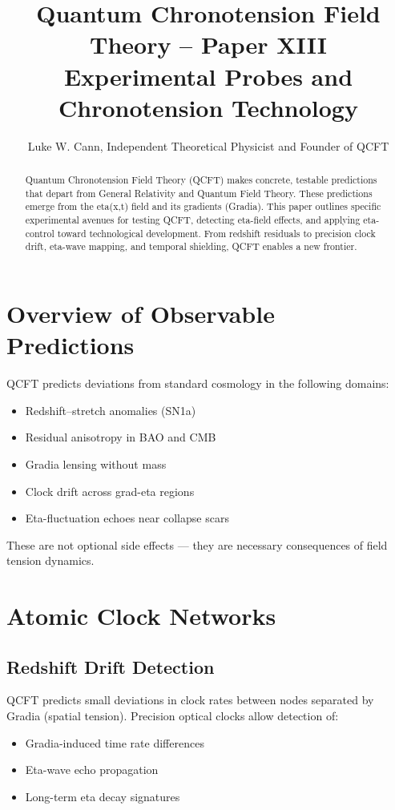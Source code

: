 \documentclass[12pt]{article}
\title{Quantum Chronotension Field Theory – Paper XIII\\Experimental Probes and Chronotension Technology}
\author{Luke W. Cann, Independent Theoretical Physicist and Founder of QCFT}
\date{}
\begin{document}
\maketitle

\begin{abstract}
Quantum Chronotension Field Theory (QCFT) makes concrete, testable predictions that depart from General Relativity and Quantum Field Theory. These predictions emerge from the eta(x,t) field and its gradients (Gradia). This paper outlines specific experimental avenues for testing QCFT, detecting eta-field effects, and applying eta-control toward technological development. From redshift residuals to precision clock drift, eta-wave mapping, and temporal shielding, QCFT enables a new frontier.
\end{abstract}

\section{Overview of Observable Predictions}

QCFT predicts deviations from standard cosmology in the following domains:

\begin{itemize}
\item Redshift–stretch anomalies (SN1a)
\item Residual anisotropy in BAO and CMB
\item Gradia lensing without mass
\item Clock drift across grad-eta regions
\item Eta-fluctuation echoes near collapse scars
\end{itemize}

These are not optional side effects — they are necessary consequences of field tension dynamics.

\section{Atomic Clock Networks}

\subsection*{Redshift Drift Detection}

QCFT predicts small deviations in clock rates between nodes separated by Gradia (spatial tension). Precision optical clocks allow detection of:

\begin{itemize}
\item Gradia-induced time rate differences
\item Eta-wave echo propagation
\item Long-term eta decay signatures
\end{itemize}
\end{document}
